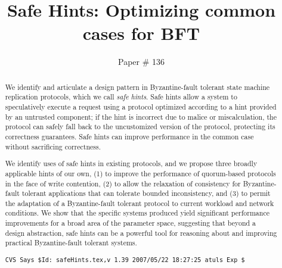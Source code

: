 \documentclass[twocolumn,10pt]{article}
\begin{document}

\title{Safe Hints: Optimizing common cases for BFT}
\author{Paper \# 136}
\date{}


\maketitle

\begin{abstract}
We identify and articulate a design pattern in Byzantine-fault tolerant
state machine replication protocols, which we call \emph{safe
hints}. Safe hints allow a system to speculatively execute a request
using a protocol optimized according to a hint provided by an untrusted
component; if the hint is incorrect due to malice or miscalculation, the
protocol can safely fall back to the uncustomized version of the
protocol, protecting its correctness guarantees.  Safe hints can improve
performance in the common case without sacrificing correctness.

We identify uses of safe hints in existing protocols, and we propose
three broadly applicable hints of our own, (1) to improve the
performance of quorum-based protocols in the face of write contention,
(2) to allow the relaxation of consistency for Byzantine-fault tolerant
applications that can tolerate bounded inconsistency, and (3) to permit
the adaptation of a Byzantine-fault tolerant protocol to current
workload and network conditions.  We show that the specific systems
produced yield significant performance improvements for a broad area of
the parameter space, suggesting that beyond a design abstraction, safe
hints can be a powerful tool for reasoning about and improving
practical Byzantine-fault tolerant systems.

{
\tiny
\begin{verbatim}
CVS Says $Id: safeHints.tex,v 1.39 2007/05/22 18:27:25 atuls Exp $
\end{verbatim}
}

\end{abstract}
\end{document}
